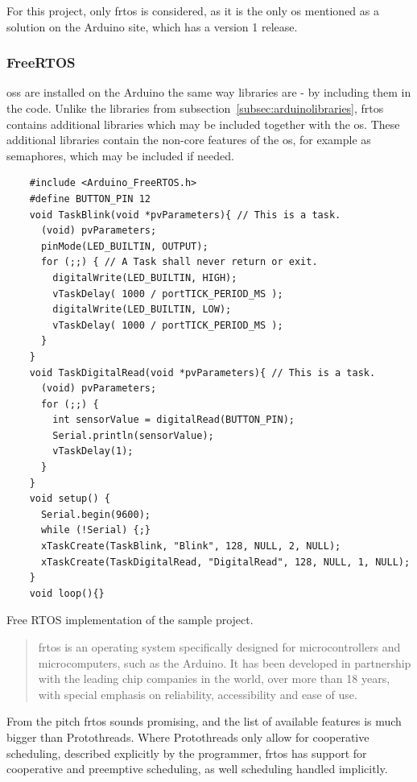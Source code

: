 For this project, only \gls{frtos} is considered, as it is the only \gls{os} mentioned as a solution on the Arduino site, which has a version 1 release.


\subsubsection{FreeRTOS}
\glspl{os} are installed on the Arduino the same way libraries are - by including them in the code. Unlike the libraries from subsection~\ref{subsec:arduinolibraries}, \gls{frtos} contains additional libraries which may be included together with the \gls{os}. These additional libraries contain the non-core features of the \gls{os}, for example as semaphores, which may be included if needed.


\begin{listing}[htb!]
  \centering
  \begin{verbatim}
    #include <Arduino_FreeRTOS.h>
    #define BUTTON_PIN 12
    void TaskBlink(void *pvParameters){ // This is a task.
      (void) pvParameters;
      pinMode(LED_BUILTIN, OUTPUT);
      for (;;) { // A Task shall never return or exit.
        digitalWrite(LED_BUILTIN, HIGH);
        vTaskDelay( 1000 / portTICK_PERIOD_MS );
        digitalWrite(LED_BUILTIN, LOW);
        vTaskDelay( 1000 / portTICK_PERIOD_MS );
      }
    }
    void TaskDigitalRead(void *pvParameters){ // This is a task.
      (void) pvParameters;
      for (;;) {
        int sensorValue = digitalRead(BUTTON_PIN);
        Serial.println(sensorValue);
        vTaskDelay(1);
      }
    }
    void setup() {
      Serial.begin(9600);
      while (!Serial) {;}
      xTaskCreate(TaskBlink, "Blink", 128, NULL, 2, NULL);
      xTaskCreate(TaskDigitalRead, "DigitalRead", 128, NULL, 1, NULL);
    }
    void loop(){}
\end{verbatim}
  \caption{Free RTOS implementation of the sample project.}
  \label{lst:freeftosexample}
\end{listing}


\blockcquote{AboutRTOS}{\gls{frtos} is an operating system specifically designed for microcontrollers and microcomputers, such as the Arduino. It has been developed in partnership with the leading chip companies in the world, over more than 18 years, with special emphasis on reliability, accessibility and ease of use.}

From the pitch \gls{frtos} sounds promising, and the list of available features is much bigger than Protothreads. Where Protothreads only allow for cooperative scheduling, described explicitly by the programmer, \gls{frtos} has support for cooperative and preemptive scheduling, as well scheduling handled implicitly.


